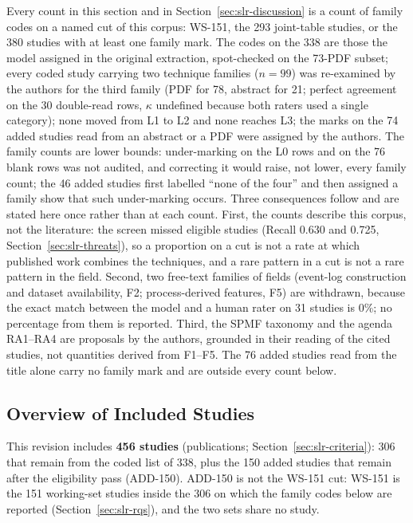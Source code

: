Every count in this section and in Section~\ref{sec:slr-discussion} is a
count of family codes on a named cut of this corpus: WS-151, the 293
joint-table studies, or the 380 studies with at least one family mark. The
codes on the 338 are those the model assigned in the original extraction,
spot-checked on the 73-PDF subset; every coded study carrying two
technique families ($n = 99$) was re-examined by the authors for the
third family (PDF for 78, abstract for 21; perfect agreement on the 30
double-read rows, $\kappa$ undefined because both raters used a single
category); none moved from L1 to L2 and none reaches L3; the marks on
the 74 added studies read from an abstract or a PDF were assigned by the
authors. The family counts are lower bounds: under-marking on the L0
rows and on the 76 blank rows was not audited, and correcting it would
raise, not lower, every family count; the 46 added studies first
labelled ``none of the four'' and then assigned a family show that such
under-marking occurs.
Three consequences follow and are stated here once rather than at each
count. First, the counts describe this corpus, not the literature: the
screen missed eligible studies (Recall 0.630 and 0.725,
Section~\ref{sec:slr-threats}), so a proportion on a cut is not a rate at
which published work combines the techniques, and a rare pattern in a cut
is not a rare pattern in the field. Second, two free-text families of
fields (event-log construction and dataset availability, F2;
process-derived features, F5) are withdrawn, because the exact match
between the model and a human rater on 31 studies is 0\%; no percentage
from them is reported. Third, the SPMF taxonomy and the agenda RA1--RA4
are proposals by the authors, grounded in their reading of the cited
studies, not quantities derived from F1--F5. The 76 added studies read from
the title alone carry no family mark and are outside every count below.

\subsection{Overview of Included Studies}

This revision includes \textbf{456 studies} (publications;
Section~\ref{sec:slr-criteria}): 306 that remain from the
coded list of 338, plus the 150 added studies that remain after the
eligibility pass (ADD-150). ADD-150 is not the WS-151 cut: WS-151 is the
151 working-set studies inside the 306 on which the family codes below
are reported (Section~\ref{sec:slr-rqs}), and the two sets share no
study.

